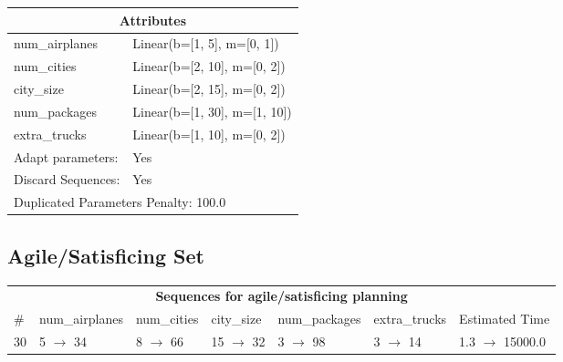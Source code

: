 \documentclass{article}
\begin{document}
                    \begin{center}
                    \begin{tabular}{p{}p{}}
                    \multicolumn{2}{c}{\bf \large Attributes}\\\midrule
                    num\_airplanes & Linear(b=[1, 5], m=[0, 1])\\
num\_cities & Linear(b=[2, 10], m=[0, 2])\\
city\_size & Linear(b=[2, 15], m=[0, 2])\\
num\_packages & Linear(b=[1, 30], m=[1, 10])\\
extra\_trucks & Linear(b=[1, 10], m=[0, 2])
                    
                    \\\midrule
                    Adapt parameters: & Yes
                
                    
                                \\\midrule
                                Discard Sequences: & Yes
                             \\\midrule
                    \multicolumn{2}{l}{Duplicated Parameters Penalty: 100.0}
                    \end{tabular}
                    \end{center}
                
                         \subsection*{Agile/Satisficing Set}

                        \begin{center}
                        \begin{tabular}{l|l|l|l|l|l|l}
                        \multicolumn{7}{c}{\bf \large Sequences for agile/satisficing planning}\\
                        \# & num\_airplanes & num\_cities & city\_size & num\_packages & extra\_trucks & Estimated Time\\\midrule
                        30&5 $\rightarrow$ 34&8 $\rightarrow$ 66&15 $\rightarrow$ 32&3 $\rightarrow$ 98&3 $\rightarrow$ 14&1.3 $\rightarrow$ 15000.0
                        \end{tabular}
                        \end{center}
                    
\end{document}
